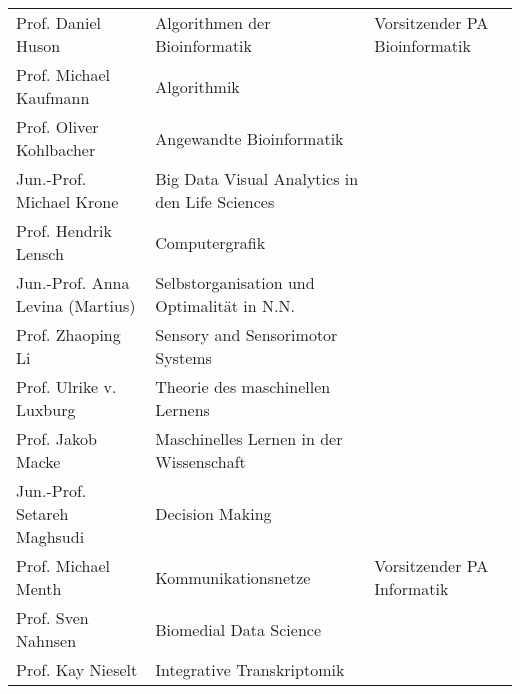 \begin{tabular}{|lll|}
	Prof. Daniel Huson               & Algorithmen der Bioinformatik                         & Vorsitzender PA Bioinformatik            \\
	Prof. Michael Kaufmann           & Algorithmik                                           &                                          \\
	Prof. Oliver Kohlbacher          & Angewandte Bioinformatik                              &                                          \\
	Jun.-Prof. Michael Krone         & Big Data Visual Analytics in den Life Sciences        &                                          \\
	Prof. Hendrik Lensch             & Computergrafik                                        &                                          \\
	Jun.-Prof. Anna Levina (Martius) & Selbstorganisation und Optimalität in N.N.            &                                          \\
	Prof. Zhaoping Li                & Sensory and Sensorimotor Systems                      &                                          \\
	Prof. Ulrike v. Luxburg          & Theorie des maschinellen Lernens                      &                                          \\
	Prof. Jakob Macke                & Maschinelles Lernen in der Wissenschaft               &                                          \\
	Jun.-Prof. Setareh Maghsudi      & Decision Making                                       &                                          \\
	Prof. Michael Menth              & Kommunikationsnetze                                   & Vorsitzender PA Informatik               \\
	Prof. Sven Nahnsen               & Biomedial Data Science                                &                                          \\
	Prof. Kay Nieselt                & Integrative Transkriptomik                            &                                          \\

\end{tabular}
